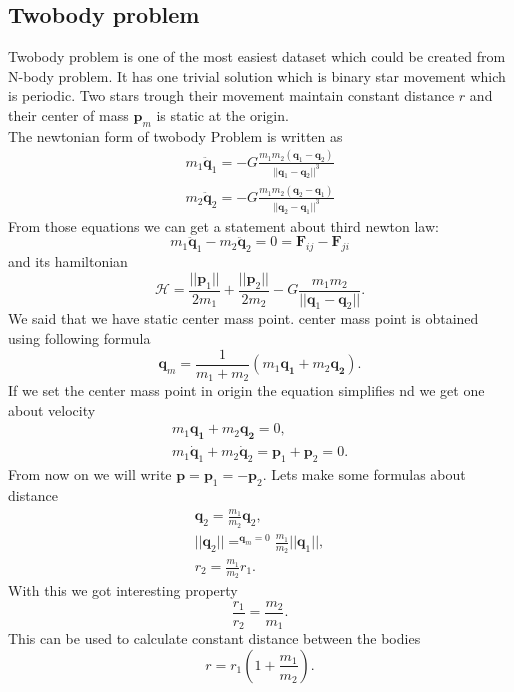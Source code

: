\subsection{Twobody problem}
Twobody problem is one of the most easiest dataset which could be created from N-body problem. It has one trivial solution which is binary star movement which is periodic.
Two stars trough their movement maintain constant distance $r$ and their center of mass $\mathbf{p}_m$ is static at the origin.\\
The newtonian form of twobody Problem is written as
\begin{eqnarray}
	m_1\ddot{\mathbf{q}}_1 = -G\frac{m_1m_2(\mathbf{q}_1-\mathbf{q}_2)}{||\mathbf{q}_1-\mathbf{q}_2||^3}\\
	m_2\ddot{\mathbf{q}}_2 = -G\frac{m_1m_2(\mathbf{q}_2-\mathbf{q}_1)}{||\mathbf{q}_2-\mathbf{q}_1||^3}
\end{eqnarray}
From those equations we can get a statement about third newton law:
\begin{equation}
	m_1\ddot{\mathbf{q}}_1 -m_2\ddot{\mathbf{q}}_2 = 0 = \mathbf{F}_{ij} - \mathbf{F}_{ji}
\end{equation}
and its hamiltonian
\begin{equation}
\mathcal{H} = \frac{||\mathbf{p}_1||}{2m_1} +\frac{||\mathbf{p}_2||}{2m_2} - G\frac{m_1m_2}{||\mathbf{q}_1 - \mathbf{q}_2||}.
\end{equation}
We said that we have static center mass point. center mass point is obtained using following formula
\begin{equation}
	\mathbf{q}_m = \frac{1}{m_1+m_2}(m_1\mathbf{q_1} + m_2\mathbf{q_2}).
\end{equation}
If we set the center mass point in origin the equation simplifies nd we get one about velocity
\begin{eqnarray}
	m_1\mathbf{q_1} + m_2\mathbf{q_2} = 0,\\
	m_1\dot{\mathbf{q}}_1 + m_2\dot{\mathbf{q}}_2 = \mathbf{p}_1 +\mathbf{p}_2 = 0.
\end{eqnarray}
From now on we will write $\mathbf{p} =\mathbf{p}_1 = -\mathbf{p}_2$.
Lets make some formulas about distance
\begin{eqnarray}
	\mathbf{q}_2 = \frac{m_1}{m_2}\mathbf{q}_2,\\
	||\mathbf{q}_2|| =^{\mathbf{q}_m=0} \frac{m_1}{m_2}||\mathbf{q}_1||,\\ 
	r_2 =\frac{m_1}{m_2}r_1.
\end{eqnarray}
With this we got interesting property
\begin{equation}
	\frac{r_1}{r_2} =\frac{m_2}{m_1}. 
\end{equation}
This can be used to calculate constant distance between the bodies
\begin{equation}
	r=r_1\left(1 + \frac{m_1}{m_2}\right).
\end{equation}


